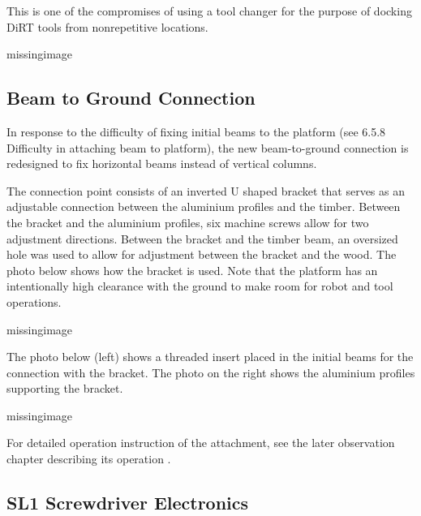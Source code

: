This is one of the compromises of using a tool changer for the purpose of docking DiRT tools from nonrepetitive locations. 

missingimage

\subsection{Beam to Ground Connection}
\label{subsection:exploration-4-beam-to-ground-connection}

In response to the difficulty of fixing initial beams to the platform (see 6.5.8 Difficulty in attaching beam to platform), the new beam-to-ground connection is redesigned to fix horizontal beams instead of vertical columns. 

The connection point consists of an inverted U shaped bracket that serves as an adjustable connection between the aluminium profiles and the timber. Between the bracket and the aluminium profiles, six machine screws allow for two adjustment directions. Between the bracket and the timber beam, an oversized hole was used to allow for adjustment between the bracket and the wood. The photo below shows how the bracket is used. Note that the platform has an intentionally high clearance with the ground to make room for robot and tool operations.

missingimage

The photo below (left) shows a threaded insert placed in the initial beams for the connection with the bracket. The photo on the right shows the aluminium profiles supporting the bracket.

missingimage

For detailed operation instruction of the attachment, see the later observation chapter describing its operation .

\subsection{SL1 Screwdriver Electronics}
\label{subsection:exploration-4-sl1-screwdriver-electronics}

